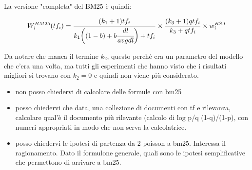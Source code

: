 La versione "completa" del BM25 è quindi:

\begin{align}
W_i^{BM25}(tf_i) = \frac{(k_1+1)tf_i}{k_1\bigg((1-b)+ b\cfrac{dl}{avgdl}\bigg) + tf_i } \times \frac{(k_3+1)qtf_i}{k_3 + qtf_i} \times w_i^{RSJ}
\end{align}

\noindent Da notare che manca il termine $k_2$, questo perché era un parametro del modello che c'era una volta, ma tutti gli esperimenti che hanno visto che i risultati migliori si trovano con $k_2=0$ e quindi non viene più considerato.

\begin{itemize}
\item non posso chiedervi di  calcolare delle formule con bm25

\item posso chiedervi che data, una collezione di documenti con tf e rilevanza, calcolare qual'è il documento più rilevante (calcolo di log p/q (1-q)/(1-p), con numeri appropriati in modo che non serva la calcolatrice.

\item posso chiedervi le ipotesi di partenza da 2-poisson a bm25. Interessa il ragionamento. Dato il formulone generale, quali sono le ipotesi semplificative che permettono di arrivare a bm25.
\end{itemize}










